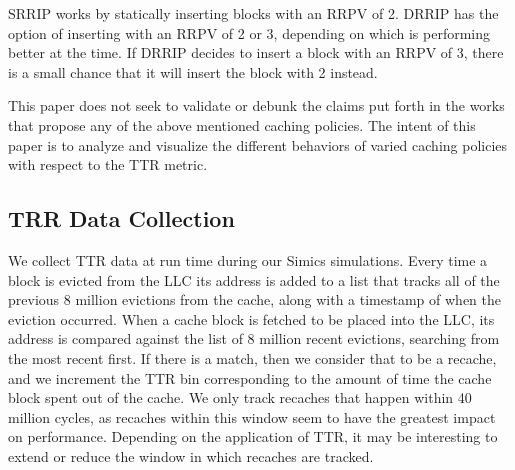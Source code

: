 SRRIP works by statically inserting blocks with an RRPV of 2.  DRRIP
has the option of inserting with an RRPV of 2 or 3, depending on which
is performing better at the time.  If DRRIP decides to insert a block
with an RRPV of 3, there is a small chance that it will insert the
block with 2 instead.

This paper does not seek to validate or debunk the claims put forth in
the works that propose any of the above mentioned caching policies.
The intent of this paper is to analyze and visualize the different
behaviors of varied caching policies with respect to the TTR metric. 

\subsection{TRR Data Collection}

We collect TTR data at run time during our Simics simulations.
Every time a block is evicted from the LLC its address is added to a
list that tracks all of the previous 8 million evictions from the
cache, along with a timestamp of when the eviction occurred. 
When a cache block is fetched to be placed into the LLC, its address
is compared against the list of 8 million recent evictions, searching
from the most recent first.  If there
is a match, then we consider that to be a recache, and we increment
the TTR bin corresponding to the amount of time the cache block spent
out of the cache.  We only track recaches that happen within 40
million cycles, as recaches within this window seem to have the
greatest impact on performance.
Depending on the application of TTR, it may be interesting to 
extend or reduce the window in which recaches are tracked.
